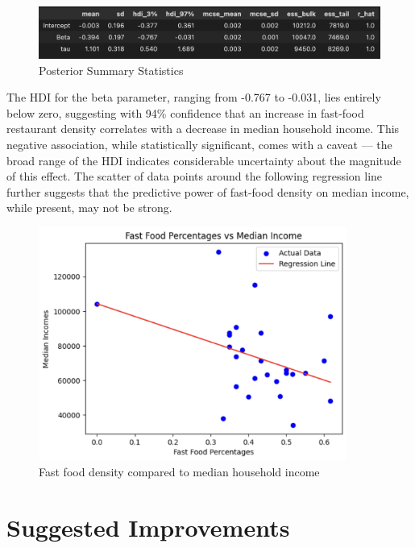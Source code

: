 \documentclass[12pt]{article}
\begin{document}
\begin{figure}[h!]
\centering
\includegraphics[width=1.0\textwidth]{../assets/results.png} 
\caption{Posterior Summary Statistics}
\label{fig:cond_prob}
\end{figure}

\noindent The HDI for the beta parameter, ranging from -0.767 to -0.031, lies entirely below zero, suggesting with 94\% confidence that an increase in fast-food restaurant density correlates with a decrease in median household income. This negative association, while statistically significant, comes with a caveat — the broad range of the HDI indicates considerable uncertainty about the magnitude of this effect. The scatter of data points around the following regression line further suggests that the predictive power of fast-food density on median income, while present, may not be strong.

\begin{figure}[h!]
\centering
\includegraphics[width=0.9\textwidth]{../assets/regression.png} 
\caption{Fast food density compared to median household income}
\label{fig:cond_prob}
\end{figure}

\newpage
\section*{Suggested Improvements}
\end{document}
